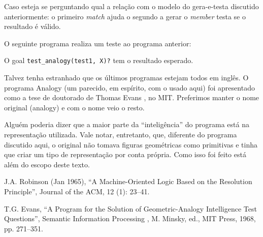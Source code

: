 \documentclass{article}
\theoremstyle{remark}
\theoremstyle{theorem}
\begin{document}
Caso esteja se perguntando qual a relação com o modelo do gera-e-testa discutido anteriormente: o primeiro \textit{match} ajuda o segundo a gerar o \textit{member} testa se o resultado é válido.

O seguinte programa realiza um teste ao programa anterior:



O goal {\tt test\_analogy(test1, X)?} tem o resultado esperado.

Talvez tenha estranhado que os últimos programas estejam todos em inglês. O programa Analogy (um parecido, em espírito, com o usado aqui) foi apresentado como a tese de doutorado de Thomas Evans \cite{evans}, no MIT. Preferimos manter o nome original (analogy) e com o nome veio o resto.

Alguém poderia dizer que a maior parte da ``inteligência'' do programa está na representação utilizada.
Vale notar, entretanto, que, diferente do programa discutido aqui, o original não tomava figuras geométricas como
primitivas e tinha que criar um tipo de representação por conta própria. Como isso foi feito está além do escopo deste texto.







  \begin{thebibliography}{1}

    J.A. Robinson (Jan 1965), ``A Machine-Oriented Logic Based on the Resolution Principle'', Journal of the ACM, 12 (1): 23–41.

    T.G. Evans, “A Program for the Solution of Geometric-Analogy Intelligence Test Questions”, Semantic Information Processing , M. Minsky, ed., MIT Press, 1968, pp. 271–351.

  \end{thebibliography}
\end{document}
